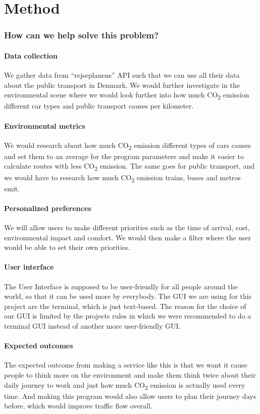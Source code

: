 \chapter{Method}\label{ch:method}

\subsection{How can we help solve this problem?}\label{subsec:how-can-we-help-solve-this-problem?}
\subsubsection{Data collection}
We gather data from ``rejseplanens'' API such that we can use all their data about the public transport in Denmark.
We would further investigate in the environmental scene where we would look further into how much \unit{CO_{2}} emission
different car types and public transport causes per kilometer.

\subsubsection{Environmental metrics}
We would research about how much \unit{CO_{2}} emission different types of cars causes and set them to an average for
the program parameters and make it easier to calculate routes with less \unit{CO_{2}} emission.
The same goes for public transport, and we would have to research how much \unit{CO_{2}} emission trains, buses and
metros emit.

\subsubsection{Personalized preferences}
We will allow users to make different priorities such as the time of arrival, cost, environmental impact and comfort.
We would then make a filter where the user would be able to set their own priorities.

\subsubsection{User interface}
The User Interface is supposed to be user-friendly for all people around the world, so that it can be used more by
everybody.
The GUI we are using for this project are the terminal, which is just text-based.
The reason for the choice of our GUI is limited by the projects rules in which we were recommended to do a terminal GUI
instead of another more user-friendly GUI\@.

\subsubsection{Expected outcomes}
The expected outcome from making a service like this is that we want it cause people to think more on the environment
and make them think twice about their daily journey to work and just how much \unit{CO_{2}} emission is actually used
every time.
And making this program would also allow users to plan their journey days before, which would improve traffic flow
overall.
